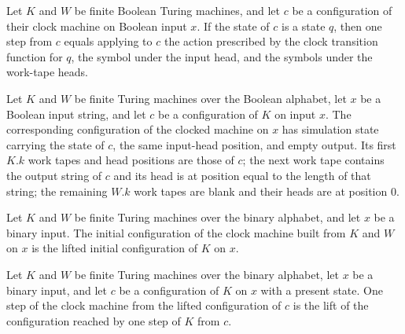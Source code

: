 \begin{lemma}
\label{Complexity.TimeHierarchy.clockTM_step_some}
\leanok
{}
Let $K$ and $W$ be finite Boolean Turing machines, and let $c$ be a configuration of
their clock machine on Boolean input $x$. If the state of $c$ is a state $q$, then one
step from $c$ equals applying to $c$ the action prescribed by the clock transition
function for $q$, the symbol under the input head, and the symbols under the work-tape
heads.
\end{lemma}

\begin{definition}
\label{Complexity.TimeHierarchy.kCfg}
\leanok
{}
Let $K$ and $W$ be finite Turing machines over the Boolean alphabet, let $x$ be a
Boolean input string, and let $c$ be a configuration of $K$ on input $x$. The
corresponding configuration of the clocked machine on $x$ has simulation state carrying
the state of $c$, the same input-head position, and empty output. Its first $K.k$ work
tapes and head positions are those of $c$; the next work tape contains the output string
of $c$ and its head is at position equal to the length of that string; the remaining
$W.k$ work tapes are blank and their heads are at position $0$.
\end{definition}

\begin{lemma}
\label{Complexity.TimeHierarchy.kCfg_init}
\leanok
{}
Let $K$ and $W$ be finite Turing machines over the binary alphabet, and let $x$ be a
binary input. The initial configuration of the clock machine built from $K$ and $W$ on
$x$ is the lifted initial configuration of $K$ on $x$.
\end{lemma}

\begin{lemma}
\label{Complexity.TimeHierarchy.kCfg_step}
\leanok
{}
Let $K$ and $W$ be finite Turing machines over the binary alphabet, let $x$ be a binary
input, and let $c$ be a configuration of $K$ on $x$ with a present state. One step of
the clock machine from the lifted configuration of $c$ is the lift of the configuration
reached by one step of $K$ from $c$.
\end{lemma}

